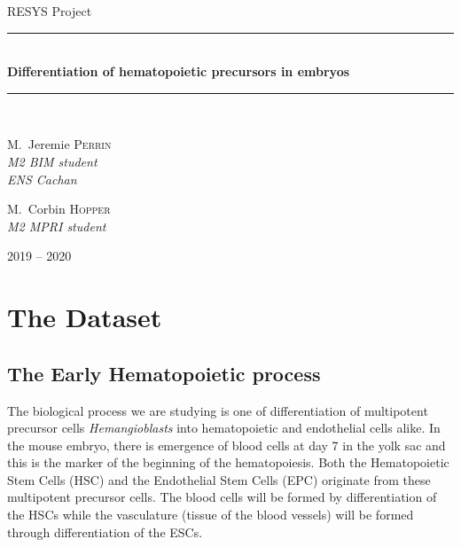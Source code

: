 \documentclass[a4paper,12pt]{book}
\theoremstyle{break}
\begin{document}

\begin{titlepage}
\begin{center}
	

{\large RESYS Project}\\[0.5cm]

\rule{\linewidth}{0.5mm} \\[0.4cm]
{ \huge \bfseries Differentiation of hematopoietic precursors in embryos\\[0.4cm] }
\rule{\linewidth}{0.5mm} \\[1.5cm]

\vspace{2cm}

\noindent
\begin{minipage}{0.4\textwidth}
  \begin{flushleft} \large
    M.~Jeremie \textsc{Perrin} \\ \small \textit{M2 BIM student}\\ \small \textit{ENS Cachan}\\
  \end{flushleft}
\end{minipage}%
\begin{minipage}{0.4\textwidth}
  \begin{flushright} \large
    M.~Corbin \textsc{Hopper} \\ \small \textit{M2 MPRI student}\\
  \end{flushright}
\end{minipage}

\vfill

{\large  2019 -- 2020}

\end{center}
\end{titlepage}

\section*{The Dataset}
\subsection*{The Early Hematopoietic process}
	The biological process we are studying is one of differentiation of multipotent precursor cells \textit{Hemangioblasts} into hematopoietic and endothelial cells alike. In the mouse embryo, there is emergence of blood cells at day 7 in the yolk sac and this is the marker of the beginning of the hematopoiesis. Both the Hematopoietic Stem Cells (HSC) and the Endothelial Stem Cells (EPC) originate from these multipotent precursor cells. The blood cells will be formed by differentiation of the HSCs while the vasculature (tissue of the blood vessels) will be formed through differentiation of the ESCs.
\end{document}

